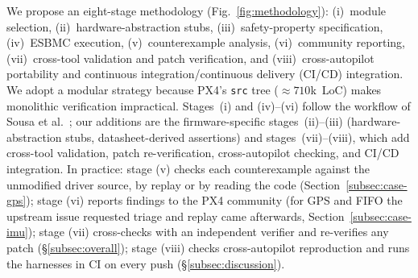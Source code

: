 \documentclass[conference]{IEEEtran}
\newcommand{\entra}[1]{#1}
\newcommand{\corr}[1]{#1}
\begin{document}
We propose an eight-stage methodology (Fig.~\ref{fig:methodology}):
(i)~module selection, (ii)~hardware-abstraction stubs,
(iii)~safety-property specification, (iv)~ESBMC execution,
(v)~counterexample analysis, (vi)~community reporting,
(vii)~cross-tool validation and patch verification, and
(viii)~cross-autopilot portability and \entra{continuous
integration/continuous delivery (CI/CD)} integration.
We adopt a modular strategy because PX4's \texttt{src} tree
(${\approx}710$k~LoC) makes monolithic verification impractical.
Stages~(i) and (iv)--(vi) follow the workflow of
Sousa et al.~\cite{Sousa2026}; our additions are the firmware-specific
stages~(ii)--(iii) (hardware-abstraction stubs, datasheet-derived
assertions) and stages~(vii)--(viii), which add cross-tool validation,
patch re-verification, cross-autopilot checking, and CI/CD integration.
\entra{In practice: \corr{stage (v) checks each counterexample against the
unmodified driver source, by replay or by reading the code (Section~\ref{subsec:case-gps}); stage (vi) reports findings to the PX4 community (for GPS and FIFO the upstream issue requested triage and replay came afterwards, Section~\ref{subsec:case-imu})}; stage (vii)
cross-checks with an independent verifier and re-verifies any patch
(\S\ref{subsec:overall}); stage (viii) checks cross-autopilot
reproduction and runs the harnesses in CI on every push
(\S\ref{subsec:discussion}).}
\end{document}
